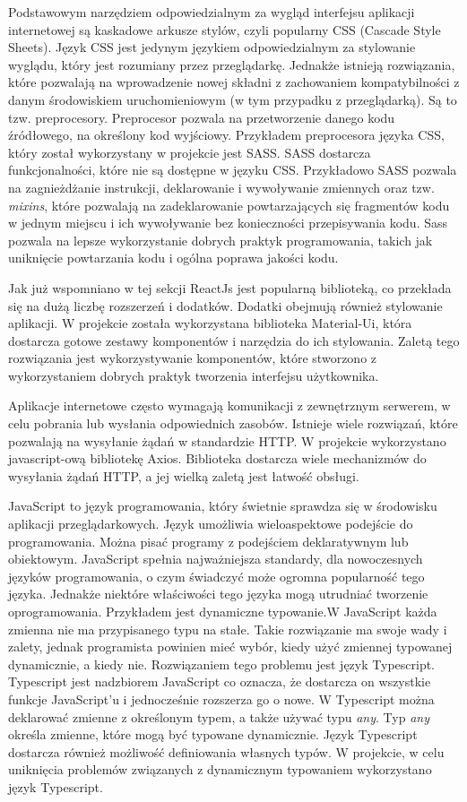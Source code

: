 \documentclass[a4paper,12pt]{book}
\begin{document}
Podstawowym narzędziem odpowiedzialnym za wygląd interfejsu aplikacji internetowej są kaskadowe arkusze stylów, czyli popularny CSS (Cascade Style Sheets). Język CSS jest jedynym językiem odpowiedzialnym za stylowanie wyglądu, który jest rozumiany przez przeglądarkę. Jednakże istnieją rozwiązania, które pozwalają na wprowadzenie nowej składni z zachowaniem kompatybilności z danym środowiskiem uruchomieniowym (w tym przypadku z przeglądarką). Są to tzw. preprocesory. Preprocesor pozwala na przetworzenie danego kodu źródłowego, na określony kod wyjściowy. Przykładem preprocesora języka CSS, który został wykorzystany w projekcie jest SASS. SASS dostarcza funkcjonalności, które nie są dostępne w języku CSS. Przykładowo SASS pozwala na zagnieżdżanie instrukcji, deklarowanie i wywoływanie zmiennych oraz tzw. \textit{mixins}, które pozwalają na zadeklarowanie powtarzających się fragmentów kodu w jednym miejscu i ich wywoływanie bez konieczności przepisywania kodu. Sass pozwala na lepsze wykorzystanie dobrych praktyk programowania, takich jak uniknięcie powtarzania kodu i ogólna poprawa jakości kodu.

Jak już wspomniano w tej sekcji ReactJs jest popularną biblioteką, co przekłada się na dużą liczbę rozszerzeń i dodatków. Dodatki obejmują również stylowanie aplikacji. W projekcie została wykorzystana biblioteka Material-Ui, która dostarcza gotowe zestawy komponentów i narzędzia do ich stylowania. Zaletą tego rozwiązania jest wykorzystywanie komponentów, które stworzono z wykorzystaniem dobrych praktyk tworzenia interfejsu użytkownika.

Aplikacje internetowe często wymagają komunikacji z zewnętrznym serwerem, w celu pobrania lub wysłania odpowiednich zasobów. Istnieje wiele rozwiązań, które pozwalają na wysyłanie żądań w standardzie HTTP. W projekcie wykorzystano javascript-ową bibliotekę Axios. Biblioteka dostarcza wiele mechanizmów do wysyłania żądań HTTP, a jej wielką zaletą jest łatwość obsługi.

JavaScript to język programowania, który świetnie sprawdza się w środowisku aplikacji przeglądarkowych. Język umożliwia wieloaspektowe podejście do programowania. Można pisać programy z podejściem deklaratywnym lub obiektowym. JavaScript spełnia najważniejsza standardy, dla nowoczesnych języków programowania, o czym świadczyć może ogromna popularność tego języka. Jednakże niektóre właściwości tego języka mogą utrudniać tworzenie oprogramowania. Przykładem jest dynamiczne typowanie.W JavaScript każda zmienna nie ma przypisanego typu na stałe. Takie rozwiązanie ma swoje wady i zalety, jednak programista powinien mieć wybór, kiedy użyć zmiennej typowanej dynamicznie, a kiedy nie. Rozwiązaniem tego problemu jest język Typescript. Typescript jest nadzbiorem JavaScript co oznacza, że dostarcza on wszystkie funkcje JavaScript'u i jednocześnie rozszerza go o nowe. W Typescript można deklarować zmienne z określonym typem, a także używać typu \textit{any}. Typ \textit{any} określa zmienne, które mogą być typowane dynamicznie. Język Typescript dostarcza również możliwość definiowania własnych typów. W projekcie, w celu uniknięcia problemów związanych z dynamicznym typowaniem wykorzystano język Typescript.
\end{document}
